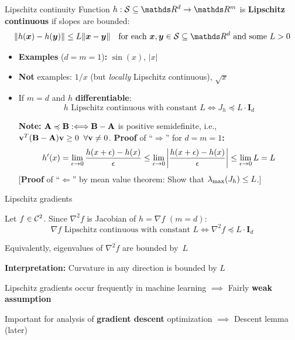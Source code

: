 \documentclass[11pt,compress,t,notes=noshow, xcolor=table]{beamer}
\begin{document}
\begin{framev}[fs=footnotesize]{Lipschitz continuity}
Function $h : \mathcal{S}\subseteq \R^d \to \R^m$ is \textbf{Lipschitz continuous} if slopes are bounded:
$$
\|h(\xv) - h(\yv)\| \leq L \|\xv - \yv\| \quad \text{for each $\xv,\yv\in\mathcal{S}\subseteq \R^d$ and some~$L>0$}
$$
\begin{itemize}
\item \textbf{Examples} ($d=m=1$)\textbf{:} $\sin(x)$, $|x|$
\item \textbf{Not} examples: $1/x$ (but \textit{locally} Lipschitz continuous), $\sqrt{x}$
\item If $m=d$ and $h$ \textbf{differentiable}:
$$
\text{$h$ Lipschitz continuous with constant $L$} \Longleftrightarrow J_h \preccurlyeq L \cdot \mathbf{I}_d
$$
\begin{footnotesize}
\textbf{Note:} $\mathbf{A} \preccurlyeq \mathbf{B} :\Longleftrightarrow \mathbf{B} - \mathbf{A}$ is positive semidefinite, i.e., $\mathbf{v}^T(\mathbf{B} - \mathbf{A})\mathbf{v} \geq 0 \;\; \forall \mathbf{v} \neq 0$.
\spacer
\textbf{Proof} of ``$\Rightarrow$'' for $d=m=1$\textbf{:}
$$
h'(x) = \lim_{\epsilon\to0} \frac{h(x+\epsilon)-h(x)}{\epsilon} \leq \lim_{\epsilon\to0}\left|\frac{h(x+\epsilon)-h(x)}{\epsilon}\right| \leq \lim_{\epsilon\to0}L = L
$$
[\textbf{Proof} of ``$\Leftarrow$'' by mean value theorem: Show that $\lambda_\text{max}(J_h) \leq L$.]
\end{footnotesize}
\end{itemize}
\end{framev}


\begin{framei}{Lipschitz gradients}
\item Let $f\in\mathcal{C}^{2}$.
Since $\nabla^2 f$ is Jacobian of $h = \nabla f$ $(m=d)$:
$$
\text{$\nabla f$ Lipschitz continuous with constant $L$} \Longleftrightarrow \nabla^2 f \preccurlyeq L \cdot \mathbf{I}_d
$$
\item Equivalently, eigenvalues of $\nabla^2 f$ are bounded by~$L$
\item \textbf{Interpretation:} Curvature in any direction is bounded by $L$
\item Lipschitz gradients occur frequently in machine learning
$\implies$ Fairly \textbf{weak assumption}
\item Important for analysis of \textbf{gradient descent} optimization
$\implies$ Descent lemma (later)
\end{framei}


\endlecture
\end{document}
